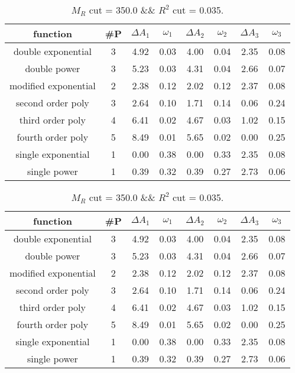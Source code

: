  
\begin{table}[H] 
\begin{center} 
\begin{tabular}{|c|c|cc|cc|cc|} 
\hline function & \#P & $\Delta A_1$ & $\omega_1$ & $\Delta A_2$ & $\omega_2$ & $\Delta A_3$ & $\omega_3$ \\ \hline 
double exponential &  3 &   4.92 &   0.03 &   4.00 &   0.04 &   2.35 &   0.08 \\ 
double power &  3 &   5.23 &   0.03 &   4.31 &   0.04 &   2.66 &   0.07 \\ 
modified exponential &  2 &   2.38 &   0.12 &   2.02 &   0.12 &   2.37 &   0.08 \\ 
second order poly &  3 &   2.64 &   0.10 &   1.71 &   0.14 &   0.06 &   0.24 \\ 
third order poly &  4 &   6.41 &   0.02 &   4.67 &   0.03 &   1.02 &   0.15 \\ 
fourth order poly &  5 &   8.49 &   0.01 &   5.65 &   0.02 &   0.00 &   0.25 \\ 
single exponential &  1 &   0.00 &   0.38 &   0.00 &   0.33 &   2.35 &   0.08 \\ 
single power &  1 &   0.39 &   0.32 &   0.39 &   0.27 &   2.73 &   0.06 \\ 
\hline 
\end{tabular} 
\caption{$M_R$ cut = 350.0 \&\& $R^2$ cut = 0.035.} 
\label{tab:FitChoices_350.0_0.035} 
\end{center} 
\end{table} 
 
 
\begin{table}[H] 
\begin{center} 
\begin{tabular}{|c|c|cc|cc|cc|} 
\hline function & \#P & $\Delta A_1$ & $\omega_1$ & $\Delta A_2$ & $\omega_2$ & $\Delta A_3$ & $\omega_3$ \\ \hline 
double exponential &  3 &   4.92 &   0.03 &   4.00 &   0.04 &   2.35 &   0.08 \\ 
double power &  3 &   5.23 &   0.03 &   4.31 &   0.04 &   2.66 &   0.07 \\ 
modified exponential &  2 &   2.38 &   0.12 &   2.02 &   0.12 &   2.37 &   0.08 \\ 
second order poly &  3 &   2.64 &   0.10 &   1.71 &   0.14 &   0.06 &   0.24 \\ 
third order poly &  4 &   6.41 &   0.02 &   4.67 &   0.03 &   1.02 &   0.15 \\ 
fourth order poly &  5 &   8.49 &   0.01 &   5.65 &   0.02 &   0.00 &   0.25 \\ 
single exponential &  1 &   0.00 &   0.38 &   0.00 &   0.33 &   2.35 &   0.08 \\ 
single power &  1 &   0.39 &   0.32 &   0.39 &   0.27 &   2.73 &   0.06 \\ 
\hline 
\end{tabular} 
\caption{$M_R$ cut = 350.0 \&\& $R^2$ cut = 0.035.} 
\label{tab:FitChoices_350.0_0.035} 
\end{center} 
\end{table} 
 
